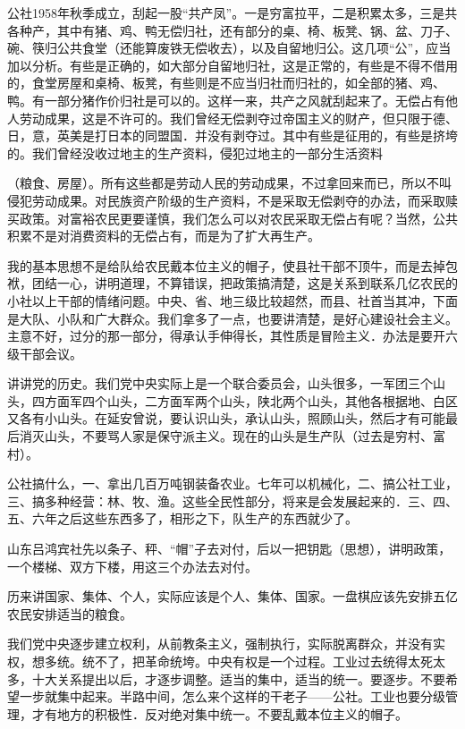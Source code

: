 公社1958年秋季成立，刮起一股“共产凤”。一是穷富拉平，二是积累太多，三是共各种产，其中有猪、鸡、鸭无偿归社，还有部分的桌、椅、板凳、锅、盆、刀子、碗、筷归公共食堂（还能算废铁无偿收去），以及自留地归公。这几项“公”，应当加以分析。有些是正确的，如大部分自留地归社，这是正常的，有些是不得不借用的，食堂房屋和桌椅、板凳，有些则是不应当归社而归社的，如全部的猪、鸡、鸭。有一部分猪作价归社是可以的。这样一来，共产之风就刮起来了。无偿占有他人劳动成果，这是不许可的。我们曾经无偿剥夺过帝国主义的财产，但只限于德、日，意，英美是打日本的同盟国．并没有剥夺过。其中有些是征用的，有些是挤垮的。我们曾经没收过地主的生产资料，侵犯过地主的一部分生活资料

（粮食、房屋）。所有这些都是劳动人民的劳动成果，不过拿回来而已，所以不叫侵犯劳动成果。对民族资产阶级的生产资料，不是采取无偿剥夺的办法，而采取赎买政策。对富裕农民更要谨慎，我们怎么可以对农民采取无偿占有呢？当然，公共积累不是对消费资料的无偿占有，而是为了扩大再生产。

我的基本思想不是给队给农民戴本位主义的帽子，使县社干部不顶牛，而是去掉包袱，团结一心，讲明道理，不算错误，把政策搞清楚，这是关系到联系几亿农民的小社以上干部的情绪问题。中央、省、地三级比较超然，而县、社首当其冲，下面是大队、小队和广大群众。我们拿多了一点，也要讲清楚，是好心建设社会主义。主意不好，过分的那一部分，得承认手伸得长，其性质是冒险主义．办法是要开六级干部会议。

讲讲党的历史。我们党中央实际上是一个联合委员会，山头很多，一军团三个山头，四方面军四个山头，二方面军两个山头，陕北两个山头，其他各根据地、白区又各有小山头。在延安曾说，要认识山头，承认山头，照顾山头，然后才有可能最后消灭山头，不要骂人家是保守派主义。现在的山头是生产队（过去是穷村、富村）。

公社搞什么，一、拿出几百万吨钢装备农业。七年可以机械化，二、搞公社工业，三、搞多种经营：林、牧、渔。这些全民性部分，将来是会发展起来的．三、四、五、六年之后这些东西多了，相形之下，队生产的东西就少了。

山东吕鸿宾社先以条子、秤、“帽”子去对付，后以一把钥匙（思想），讲明政策，一个楼梯、双方下楼，用这三个办法去对付。

历来讲国家、集体、个人，实际应该是个人、集体、国家。一盘棋应该先安排五亿农民安排适当的粮食。

我们党中央逐步建立权利，从前教条主义，强制执行，实际脱离群众，并没有实权，想多统。统不了，把革命统垮。中央有权是一个过程。工业过去统得太死太多，十大关系提出以后，才逐步调整。适当的集中，适当的统一。要逐步。不要希望一步就集中起来。半路中间，怎么来个这样的干老子——公社。工业也要分级管理，才有地方的积极性．反对绝对集中统一。不要乱戴本位主义的帽子。

